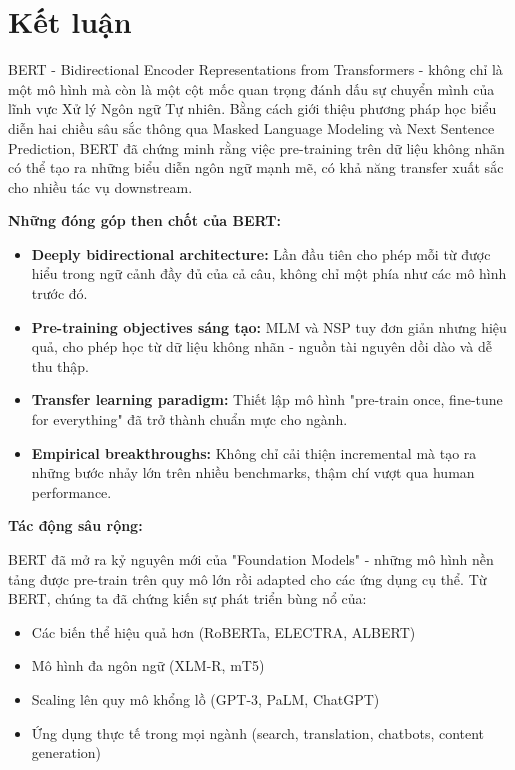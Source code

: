 \section{Kết luận}
\label{sec:ket_luan}
BERT - Bidirectional Encoder Representations from Transformers - không chỉ là một mô hình mà còn là một cột mốc quan trọng đánh dấu sự chuyển mình của lĩnh vực Xử lý Ngôn ngữ Tự nhiên. Bằng cách giới thiệu phương pháp học biểu diễn hai chiều sâu sắc thông qua Masked Language Modeling và Next Sentence Prediction, BERT đã chứng minh rằng việc pre-training trên dữ liệu không nhãn có thể tạo ra những biểu diễn ngôn ngữ mạnh mẽ, có khả năng transfer xuất sắc cho nhiều tác vụ downstream.

\textbf{Những đóng góp then chốt của BERT:}
\begin{itemize}
    \item \textbf{Deeply bidirectional architecture:} Lần đầu tiên cho phép mỗi từ được hiểu trong ngữ cảnh đầy đủ của cả câu, không chỉ một phía như các mô hình trước đó.
    
    \item \textbf{Pre-training objectives sáng tạo:} MLM và NSP tuy đơn giản nhưng hiệu quả, cho phép học từ dữ liệu không nhãn - nguồn tài nguyên dồi dào và dễ thu thập.
    
    \item \textbf{Transfer learning paradigm:} Thiết lập mô hình "pre-train once, fine-tune for everything" đã trở thành chuẩn mực cho ngành.
    
    \item \textbf{Empirical breakthroughs:} Không chỉ cải thiện incremental mà tạo ra những bước nhảy lớn trên nhiều benchmarks, thậm chí vượt qua human performance.
\end{itemize}

\textbf{Tác động sâu rộng:}

BERT đã mở ra kỷ nguyên mới của "Foundation Models" - những mô hình nền tảng được pre-train trên quy mô lớn rồi adapted cho các ứng dụng cụ thể. Từ BERT, chúng ta đã chứng kiến sự phát triển bùng nổ của:
\begin{itemize}
    \item Các biến thể hiệu quả hơn (RoBERTa, ELECTRA, ALBERT)
    \item Mô hình đa ngôn ngữ (XLM-R, mT5)
    \item Scaling lên quy mô khổng lồ (GPT-3, PaLM, ChatGPT)
    \item Ứng dụng thực tế trong mọi ngành (search, translation, chatbots, content generation)
\end{itemize}

